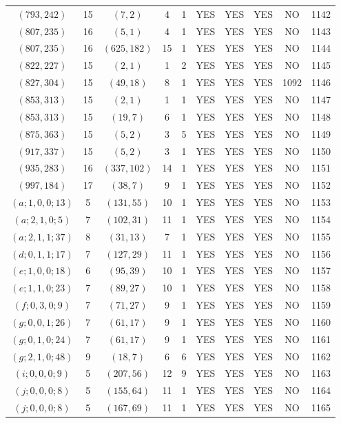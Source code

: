 \begin{longtable}{|c|c|c|c|c|c|c|c|c|c|}
$(793, 242)$ & 15 & $(7, 2)$ & 4 & 1 & YES & YES & YES & NO & 1142\\
$(807, 235)$ & 16 & $(5, 1)$ & 4 & 1 & YES & YES & YES & NO & 1143\\
$(807, 235)$ & 16 & $(625, 182)$ & 15 & 1 & YES & YES & YES & NO & 1144\\
$(822, 227)$ & 15 & $(2, 1)$ & 1 & 2 & YES & YES & YES & NO & 1145\\
$(827, 304)$ & 15 & $(49, 18)$ & 8 & 1 & YES & YES & YES & 1092 & 1146\\
$(853, 313)$ & 15 & $(2, 1)$ & 1 & 1 & YES & YES & YES & NO & 1147\\
$(853, 313)$ & 15 & $(19, 7)$ & 6 & 1 & YES & YES & YES & NO & 1148\\
$(875, 363)$ & 15 & $(5, 2)$ & 3 & 5 & YES & YES & YES & NO & 1149\\
$(917, 337)$ & 15 & $(5, 2)$ & 3 & 1 & YES & YES & YES & NO & 1150\\
$(935, 283)$ & 16 & $(337, 102)$ & 14 & 1 & YES & YES & YES & NO & 1151\\
$(997, 184)$ & 17 & $(38, 7)$ & 9 & 1 & YES & YES & YES & NO & 1152\\
$(a; 1, 0, 0; 13)$ & 5 & $(131, 55)$ & 10 & 1 & YES & YES & YES & NO & 1153\\
$(a; 2, 1, 0; 5)$ & 7 & $(102, 31)$ & 11 & 1 & YES & YES & YES & NO & 1154\\
$(a; 2, 1, 1; 37)$ & 8 & $(31, 13)$ & 7 & 1 & YES & YES & YES & NO & 1155\\
$(d; 0, 1, 1; 17)$ & 7 & $(127, 29)$ & 11 & 1 & YES & YES & YES & NO & 1156\\
$(e; 1, 0, 0; 18)$ & 6 & $(95, 39)$ & 10 & 1 & YES & YES & YES & NO & 1157\\
$(e; 1, 1, 0; 23)$ & 7 & $(89, 27)$ & 10 & 1 & YES & YES & YES & NO & 1158\\
$(f; 0, 3, 0; 9)$ & 7 & $(71, 27)$ & 9 & 1 & YES & YES & YES & NO & 1159\\
$(g; 0, 0, 1; 26)$ & 7 & $(61, 17)$ & 9 & 1 & YES & YES & YES & NO & 1160\\
$(g; 0, 1, 0; 24)$ & 7 & $(61, 17)$ & 9 & 1 & YES & YES & YES & NO & 1161\\
$(g; 2, 1, 0; 48)$ & 9 & $(18, 7)$ & 6 & 6 & YES & YES & YES & NO & 1162\\
$(i; 0, 0, 0; 9)$ & 5 & $(207, 56)$ & 12 & 9 & YES & YES & YES & NO & 1163\\
$(j; 0, 0, 0; 8)$ & 5 & $(155, 64)$ & 11 & 1 & YES & YES & YES & NO & 1164\\
$(j; 0, 0, 0; 8)$ & 5 & $(167, 69)$ & 11 & 1 & YES & YES & YES & NO & 1165
\end{longtable}
